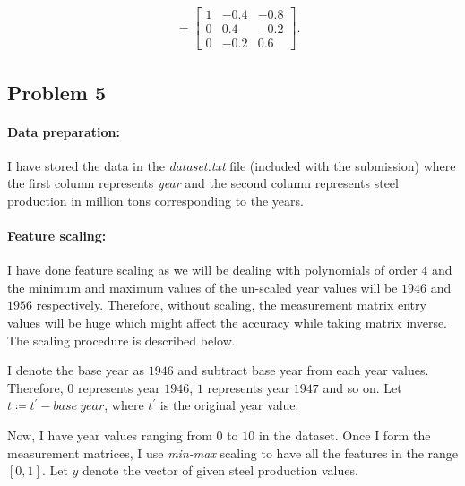 \begin{align*}
	&= \begin{bmatrix}1 & -0.4 & -0.8\\0 & 0.4 & -0.2\\0 & -0.2 & 0.6\end{bmatrix}.
\end{align*}
\subsection*{Problem 5}
\paragraph{Data preparation:}I have stored the data in the \textit{dataset.txt} file (included with the submission) where the first column represents \textit{year} and the second column represents steel production in million tons corresponding to the years.
\paragraph{Feature scaling:}I have done feature scaling as we will be dealing with polynomials of order $4$ and the minimum and maximum values of the un-scaled year values will be $1946$ and $1956$ respectively. Therefore, without scaling, the measurement matrix entry values will be huge which might affect the accuracy while taking matrix inverse. The scaling procedure is described below.

I denote the base year as $1946$ and subtract base year from each year values. Therefore, $0$ represents year $1946$, $1$ represents year $1947$ and so on. Let $t \coloneqq t^{\prime}-base\ year$, where $t^{\prime}$ is the original year value.

Now, I have year values ranging from $0$ to $10$ in the dataset. Once I form the measurement matrices, I use \textit{min-max} scaling to have all the features in the range $[0, 1]$. Let $y$ denote the vector of given steel production values.
